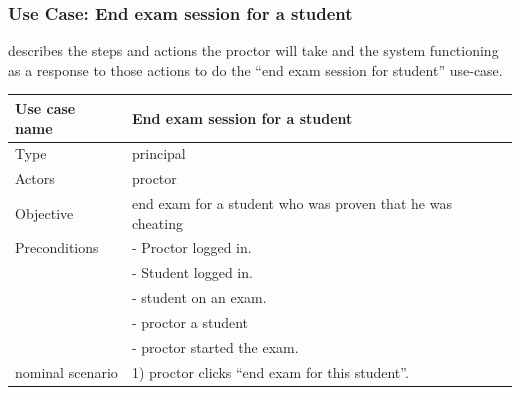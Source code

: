 \documentclass[]{uc2pfecaneva}
\begin{document}
    \thispagestyle{empty}
    \begin{table}[h]
        \raggedright\subsubsection{Use Case: End exam session for a student}
        describes the steps and actions the proctor will take and the system functioning as a response
        to those actions to do the “end exam session for student” use-case.\linebreak \\
        \begin{tabularx}{\textwidth}{|l|X|}
            \hline
            Use case name         & End exam session for a student                                                                                                \\ \hline
            Type                  & principal                                                                                                              \\ \hline
            Actors                & proctor                                                                                                                \\ \hline
            Objective             & end exam for a student who was proven that he was cheating                                                             \\ \hline
            Preconditions
            & - Proctor logged in.                                                                                                   \\
            & - Student logged in.                                                                                                   \\
            & - student on an exam.                                                                                                  \\
            & - proctor a student                                                                                                 \\
            & - proctor started the exam.                                                                                            \\ \hline
            nominal scenario
            & 1) proctor clicks “end exam for this student”.                                                                         \\

\end{tabularx}
\end{table}
\end{document}
